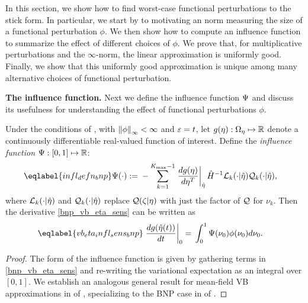 In this section, we show how to find worst-case functional perturbations to the
stick form. In particular, we start by  to motivating an norm measuring the size
of a functional perturbation $\phi$. We then show how to compute an influence
function to summarize the effect of different choices of $\phi$. We prove that,
for multiplicative perturbations and the $\infty$-norm, the linear approximation
is uniformly good. Finally, we show that this uniformly good approximation is
unique among many alternative choices of functional perturbation.

\noindent \textbf{The influence function.}
%
Next we define the influence function $\Psi$ and discuss its usefulness for
understanding the effect of functional perturbations $\phi$.
%
\begin{cor}
%
Under the conditions of , with $\left\Vert\phi\right\Vert_{\infty} < \infty$ and
$\varepsilon = t$, let $g(\eta): \Omega_{\eta} \mapsto \mathbb{R}$ denote a
continuously differentiable real-valued function of interest.  Define the
\emph{influence function} $\Psi: [0,1] \mapsto \mathbb{R}$: 
%
\begin{align} \eqlabel{infl_defn_bnp}
%
\infl(\cdot) :={}&
    - \sum_{k=1}^{\kmax-1} \fracat{d g(\eta)}{ d \eta^T}{\etaopt} \hessopt^{-1}
        \lqgradbark{\cdot \vert \etaopt}
        \qk(\cdot \vert \etaopt),
%
\end{align} where $\mathcal{L}_k({\cdot \vert \hat\eta})$ and $\mathcal{Q}_k(\cdot \vert
\hat\eta)$ replace $\mathcal{Q}(\zeta \vert \eta)$ with just the factor of $\mathcal{Q}$ for
$\nu_k$.
%
Then the derivative \eqref{bnp_vb_eta_sens} can be written as
%
\begin{align} \eqlabel{vb_eta_infl_sens_bnp}
%
\fracat{d \g(\etaopt(\t))}{d \t}{0} ={}&
    \int_0^1 \infl(\nu_0) \phi(\nu_0) d\nu_0.
%
\end{align}
\end{cor}
%
\begin{proof}
%
The form of the influence function is given by gathering terms in
\eqref{bnp_vb_eta_sens} and re-writing the variational expectation as an
integral over $[0,1]$. We establish an analogous general result for mean-field
VB approximations in  of
, specializing to the BNP case in
 of .
%
\end{proof}

